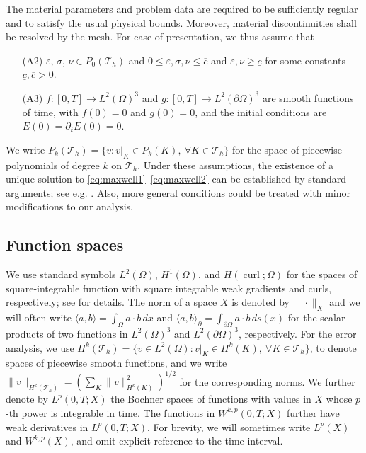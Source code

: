 \documentclass[12pt,reqno,a4paper]{amsart}
\theoremstyle{definition}
\def\Th{\mathcal{T}_h}
\def\dt{\partial_{t}}
\def\curl{\operatorname{curl}}
\def\K{K}
\def\Th{\mathcal{T}_h}
\def\eps{\varepsilon}
\def\la{\langle}
\def\ra{\rangle}
\begin{document}
The material parameters and problem data are required to be sufficiently regular and to satisfy the usual physical bounds. Moreover, material discontinuities shall be resolved by the mesh. 
For ease of presentation, we thus assume that
\begin{enumerate}[topsep=1em]
\item[(A2)]  %
$\eps$, $\sigma$, $\nu \in P_0(\Th)$ and $0 \le \eps,\sigma,\nu \le \overline c$ and $\eps,\nu \ge \underline c$ for some constants $\underline c, \overline c>0$. \\[-1ex]
\item[(A3)] %
$f : [0,T] \to L^2(\Omega)^3$ and $g: [0,T] \to L^2(\partial\Omega)^3$ are smooth functions of time, with $f(0)=0$ and $g(0)=0$, and the initial conditions are $E(0)=\dt E(0)=0$. 
\end{enumerate}
We write $P_k(\Th)=\{v : v|_K \in P_k(K), \ \forall K \in \Th\}$ for the space of piecewise polynomials of degree $k$ on $\Th$.
Under these assumptions, the existence of a unique solution to \eqref{eq:maxwell1}--\eqref{eq:maxwell2} can be established by standard arguments; see e.g. \cite{Leis88,Monk92a}. 
Also, more general conditions could be treated with minor modifications to our analysis.

\subsection*{Function spaces}

We use standard symbols $L^2(\Omega)$, $H^1(\Omega)$, and $H(\curl;\Omega)$ for the spaces of square-integrable function with square integrable weak gradients and curls, respectively; see \cite{Monk03} for details. 
The norm of a space $X$ is denoted by $\|\cdot\|_{X}$ and we will often write $\la a,b\ra = \int_\Omega a \cdot b \, dx$ and $\la a,b\ra_{\partial}=\int_{\partial\Omega} a \cdot b \, ds(x)$ for the scalar products of two functions in $L^2(\Omega)^3$ and $L^2(\partial\Omega)^3$, respectively. 
For the error analysis, we use $H^k(\Th)=\{v \in L^2(\Omega) : v|_\K \in H^k(\K), \ \forall \K \in \Th\}$, to denote spaces of piecewise smooth functions, and we write $\|v\|_{H^k(\Th)} = (\sum_\K \|v\|_{H^k(\K)}^2)^{1/2}$ for the corresponding norms. 
We further denote by $L^p(0,T;X)$ the Bochner spaces of functions with values in $X$ whose $p$-th power is integrable in time. The functions in $W^{k,p}(0,T;X)$ further have weak derivatives in $L^p(0,T;X)$. 
For brevity, we will sometimes write $L^p(X)$ and $W^{k,p}(X)$, and omit explicit reference to the time interval.
\end{document}

